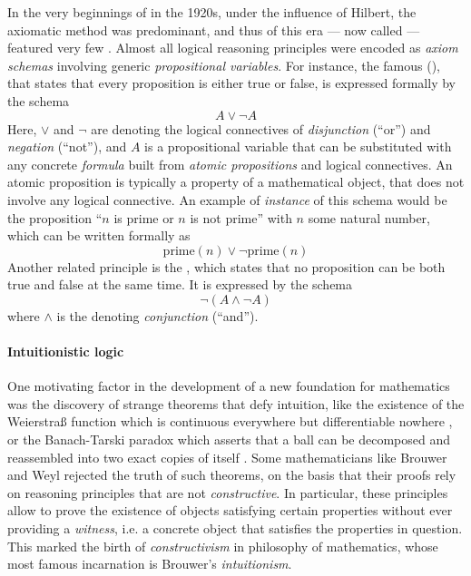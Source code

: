 In the very beginnings of  in the 1920s, under the influence of
Hilbert, the axiomatic method was predominant, and thus  of
this era --- now called  --- featured very few
. Almost all logical reasoning principles were encoded as
\emph{axiom schemas} involving generic \emph{propositional variables}. For
instance, the famous  (), that states
that every proposition is either true or false, is expressed formally by the
schema
$$A \lor \neg A$$
Here, $\lor$ and $\neg$ are  denoting the logical connectives of
\emph{disjunction} (``or'') and \emph{negation} (``not''), and $A$ is a
propositional variable that can be substituted with any concrete \emph{formula}
built from \emph{atomic propositions} and logical connectives. An atomic
proposition is typically a property of a mathematical object, that does not
involve any logical connective. An example of \emph{instance} of this schema
would be the proposition ``$n$ is prime or $n$ is not prime'' with $n$ some
natural number, which can be written formally as
$$\mathrm{prime}(n) \lor \neg\mathrm{prime}(n)$$
Another related principle is the , which states
that no proposition can be both true and false at the same time. It is expressed
by the schema
$$\neg (A \land \neg A)$$
where $\land$ is the  denoting \emph{conjunction} (``and'').

\paragraph{Intuitionistic logic}

One motivating factor in the development of a new foundation for mathematics was
the discovery of strange theorems that defy intuition, like the existence of the
Weierstra{\ss} function which is continuous everywhere but differentiable
nowhere , or the Banach-Tarski paradox which
asserts that a ball can be decomposed and reassembled into two exact copies of
itself . Some mathematicians like Brouwer and Weyl
rejected the truth of such theorems, on the basis that their proofs rely on
reasoning principles that are not \emph{constructive}. In particular, these principles
allow to prove the existence of objects satisfying certain properties without
ever providing a \emph{witness}, i.e. a concrete object that satisfies the
properties in question. This marked the birth of \emph{constructivism} in
philosophy of mathematics, whose most famous incarnation is Brouwer's
\emph{intuitionism}.

